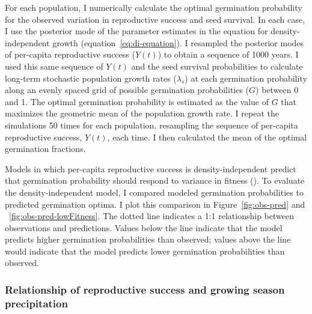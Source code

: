 \documentclass[12pt, oneside, titlepage]{article}   	%
\begin{document}
{For each population, I numerically calculate the optimal germination probability for the observed variation in reproductive success and seed survival. In each case, I use the posterior mode of the parameter estimates in the equation for density-independent growth (equation~\eqref{eq:di-equation}). I resampled the posterior modes of per-capita reproductive success ($Y(t)$) to obtain a sequence of 1000 years. I used this same sequence of $Y(t)$ and the seed survival probabilities to calculate long-term stochastic population growth rates ($\lambda_s$) at each germination probability along an evenly spaced grid of possible germination probabilities ($G$) between 0 and 1. The optimal germination probability is estimated as the value of $G$ that maximizes the geometric mean of the population growth rate. I repeat the simulations 50 times for each population, resampling the sequence of per-capita reproductive success, $Y(t)$, each time. I then calculated the mean of the optimal germination fractions. 


Models in which per-capita reproductive success is density-independent predict that germination probability should respond to variance in fitness (\cite{cohen1966}). To evaluate the density-independent model, I compared modeled germination probabilities to predicted germination optima. I plot this comparison in Figure~\ref{fig:obs-pred} and ~\ref{fig:obs-pred-lowFitness}. The dotted line indicates a 1:1 relationship between observations and predictions. Values below the line indicate that the model predicts higher germination probabilities than observed; values above the line would indicate that the model predicts lower germination probabilities than observed.

\subsubsection{Relationship of reproductive success and growing season precipitation}

}
\end{document}
